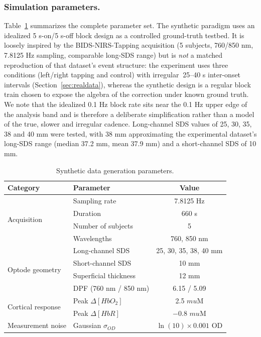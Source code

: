 \documentclass[11pt]{article}
\def\mu{mu}%
\def\sim{~}%
\def\mathrm#1{#1}%
\def\,{ }%
\begin{document}
\subsubsection{Simulation parameters.}
Table~\ref{tab:params} summarizes the complete parameter set. The synthetic paradigm uses an idealized 5\,s-on/5\,s-off block design as a controlled ground-truth testbed. It is loosely inspired by the BIDS-NIRS-Tapping acquisition\cite{r36} (5 subjects, 760/850\,nm, 7.8125\,Hz sampling, comparable long-SDS range) but is \emph{not} a matched reproduction of that dataset's event structure: the experiment uses three conditions (left/right tapping and control) with irregular $\sim$25--40\,s inter-onset intervals (Section~\ref{sec:realdata}), whereas the synthetic design is a regular block train chosen to expose the algebra of the correction under known ground truth. We note that the idealized 0.1\,Hz block rate sits near the 0.1\,Hz upper edge of the analysis band and is therefore a deliberate simplification rather than a model of the true, slower and irregular cadence. Long-channel SDS values of 25, 30, 35, 38 and 40\,mm were tested, with 38\,mm approximating the experimental dataset's long-SDS range (median 37.2\,mm, mean 37.9\,mm) and a short-channel SDS of 10\,mm.

\begin{table}[ht]
\centering
\caption{Synthetic data generation parameters.}
\label{tab:params}
\begin{tabular}{@{}llc@{}}
\toprule
\textbf{Category} & \textbf{Parameter} & \textbf{Value} \\
\midrule
\multirow{4}{*}{Acquisition} & Sampling rate & 7.8125\,Hz \\
& Duration & 660\,s \\
& Number of subjects & 5 \\
& Wavelengths & 760, 850\,nm \\
\midrule
\multirow{4}{*}{Optode geometry} & Long-channel SDS & 25, 30, 35, 38, 40\,mm \\
& Short-channel SDS & 10\,mm \\
& Superficial thickness & 12\,mm \\
& DPF (760\,nm / 850\,nm) & 6.15 / 5.09 \\
\midrule
\multirow{2}{*}{Cortical response} & Peak $\Delta[\mathrm{HbO}_2]$ & 2.5\,$\mu$M \\
& Peak $\Delta[\mathrm{HbR}]$ & $-$0.8\,$\mu$M \\
\midrule
Measurement noise & Gaussian $\sigma_{\mathrm{OD}}$ & $\ln(10) \times 0.001$\,OD \\
\bottomrule
\end{tabular}
\end{table}
\end{document}
